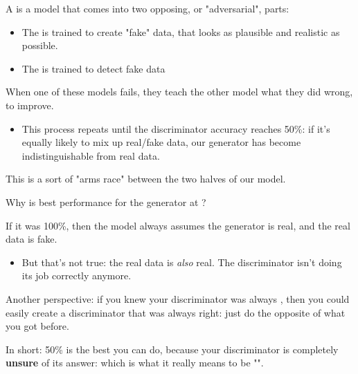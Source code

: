         \begin{definition}
            A  is a model that comes into two opposing, or "adversarial", parts:

            \begin{itemize}
                \item The  is trained to create "fake" data, that looks as plausible and realistic as possible.

                \item The  is trained to detect fake data
            \end{itemize}

            When one of these models fails, they teach the other model what they did wrong, to improve. 

            \begin{itemize}
                \item This process repeats until the discriminator accuracy reaches 50\%: if it's equally likely to mix up real/fake data, our generator has become indistinguishable from real data.
            \end{itemize}
        \end{definition}

        This is a sort of "arms race" between the two halves of our model.\\ 

        \begin{clarification}
            Why is best performance for the generator at ?

            If it was 100\%, then the model always assumes the generator is real, and the real data is fake.

            \begin{itemize}
                \item But that's not true: the real data is \textit{also} real. The discriminator isn't doing its job correctly anymore.
            \end{itemize}

            Another perspective: if you knew your discriminator was always , then you could easily create a discriminator that was always right: just do the opposite of what you got before.

            \subsecdiv

            In short: 50\% is the best you can do, because your discriminator is completely \textbf{unsure} of its answer: which is what it really means to be "".
        \end{clarification}
        

